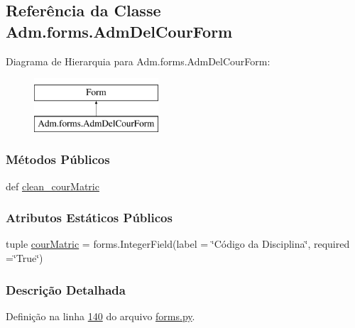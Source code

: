 \hypertarget{classAdm_1_1forms_1_1AdmDelCourForm}{\subsection{Referência da Classe Adm.\-forms.\-Adm\-Del\-Cour\-Form}
\label{classAdm_1_1forms_1_1AdmDelCourForm}
}
Diagrama de Hierarquia para Adm.\-forms.\-Adm\-Del\-Cour\-Form\-:\begin{figure}[H]
\begin{center}
\leavevmode
\includegraphics[height=2.000000cm]{da/d13/classAdm_1_1forms_1_1AdmDelCourForm}
\end{center}
\end{figure}
\subsubsection*{Métodos Públicos}
\begin{DoxyCompactItemize}
\item 
def \hyperlink{classAdm_1_1forms_1_1AdmDelCourForm_aea58507d923f08b75d0c2f5898c162f7}{clean\-\_\-cour\-Matric}
\end{DoxyCompactItemize}
\subsubsection*{Atributos Estáticos Públicos}
\begin{DoxyCompactItemize}
\item 
tuple \hyperlink{classAdm_1_1forms_1_1AdmDelCourForm_a8ed2bcde12e5bb321960517b3c653b2f}{cour\-Matric} = forms.\-Integer\-Field(label = \char`\"{}Código da Disciplina\char`\"{}, required =\char`\"{}True\char`\"{})
\end{DoxyCompactItemize}


\subsubsection{Descrição Detalhada}


Definição na linha \hyperlink{Adm_2forms_8py_source_l00140}{140} do arquivo \hyperlink{Adm_2forms_8py_source}{forms.\-py}.




